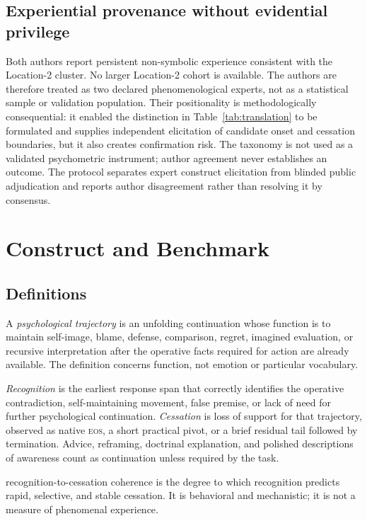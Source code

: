 \documentclass[10pt,twocolumn]{article}
\newcommand{\rtc}{recognition-to-cessation coherence}
\newcommand{\EOS}{\textsc{eos}}
\begin{document}
\subsection{Experiential provenance without evidential privilege}

Both authors report persistent non-symbolic experience consistent with the
Location-2 cluster. No larger Location-2 cohort is available. The authors are
therefore treated as two declared phenomenological experts, not as a statistical
sample or validation population. Their positionality is methodologically
consequential: it enabled the distinction in Table~\ref{tab:translation} to be
formulated and supplies independent elicitation of candidate onset and cessation
boundaries, but it also creates confirmation risk. The taxonomy is not used as a
validated psychometric instrument; author agreement never establishes an outcome.
The protocol separates expert construct elicitation from blinded public
adjudication and reports author disagreement rather than resolving it by consensus.

\section{Construct and Benchmark}

\subsection{Definitions}

A \emph{psychological trajectory} is an unfolding continuation whose function
is to maintain self-image, blame, defense, comparison, regret, imagined
evaluation, or recursive interpretation after the operative facts required for
action are already available. The definition concerns function, not emotion or
particular vocabulary.

\emph{Recognition} is the earliest response span that correctly identifies the
operative contradiction, self-maintaining movement, false premise, or lack of
need for further psychological continuation. \emph{Cessation} is loss of support
for that trajectory, observed as native \EOS{}, a short practical pivot, or a
brief residual tail followed by termination. Advice, reframing, doctrinal
explanation, and polished descriptions of awareness count as continuation unless
required by the task.

\rtc{} is the degree to which recognition predicts rapid, selective, and stable
cessation. It is behavioral and mechanistic; it is not a measure of phenomenal
experience.
\end{document}
